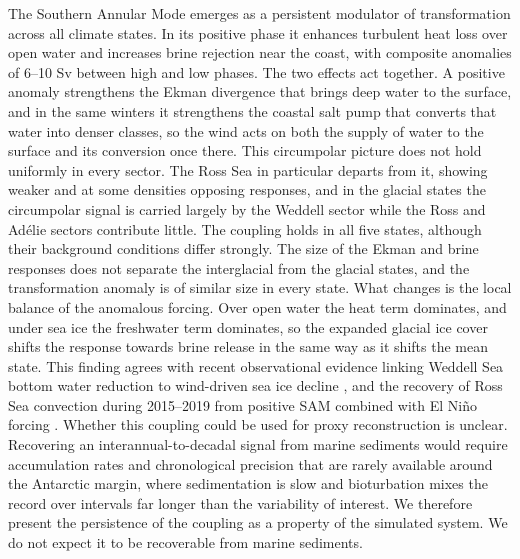 \documentclass[pdflatex,sn-nature]{sn-jnl}
\begin{document}
The Southern Annular Mode emerges as a persistent modulator of transformation across all climate states. In its positive phase it enhances turbulent heat loss over open water and increases brine rejection near the coast, with composite anomalies of 6--10 Sv between high and low phases. The two effects act together. A positive anomaly strengthens the Ekman divergence that brings deep water to the surface, and in the same winters it strengthens the coastal salt pump that converts that water into denser classes, so the wind acts on both the supply of water to the surface and its conversion once there. This circumpolar picture does not hold uniformly in every sector. The Ross Sea in particular departs from it, showing weaker and at some densities opposing responses, and in the glacial states the circumpolar signal is carried largely by the Weddell sector while the Ross and Ad\'elie sectors contribute little. The coupling holds in all five states, although their background conditions differ strongly. The size of the Ekman and brine responses does not separate the interglacial from the glacial states, and the transformation anomaly is of similar size in every state. What changes is the local balance of the anomalous forcing. Over open water the heat term dominates, and under sea ice the freshwater term dominates, so the expanded glacial ice cover shifts the response towards brine release in the same way as it shifts the mean state. This finding agrees with recent observational evidence linking Weddell Sea bottom water reduction to wind-driven sea ice decline \cite{Zhou2023}, and the recovery of Ross Sea convection during 2015--2019 from positive SAM combined with El Ni\~no forcing \cite{Silvano2020}. Whether this coupling could be used for proxy reconstruction is unclear. Recovering an interannual-to-decadal signal from marine sediments would require accumulation rates and chronological precision that are rarely available around the Antarctic margin, where sedimentation is slow and bioturbation mixes the record over intervals far longer than the variability of interest. We therefore present the persistence of the coupling as a property of the simulated system. We do not expect it to be recoverable from marine sediments.
\end{document}
